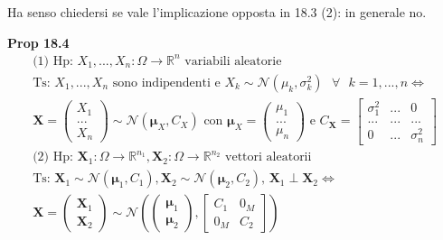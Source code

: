 \documentclass{article}
\begin{document}
Ha senso chiedersi se vale l'implicazione opposta in 18.3 (2): in generale
no.

\textbf{Prop 18.4}%
\begin{gather*}
\text{(1) Hp: }X_{1},...,X_{n}:\Omega \rightarrow 
\mathbb{R}
^{n}\text{ variabili aleatorie} \\
\text{Ts: }X_{1},...,X_{n}\text{ sono indipendenti e }X_{k}\sim \mathcal{N}%
\left( \mu _{k},\sigma _{k}^{2}\right) \text{ }\forall \text{ }%
k=1,...,n\Longleftrightarrow \\
\mathbf{X}=\left( 
\begin{array}{c}
X_{1} \\ 
... \\ 
X_{n}%
\end{array}%
\right) \sim \mathcal{N}\left( \mathbf{\mu }_{X},C_{X}\right) \text{ con }%
\mathbf{\mu }_{X}=\left( 
\begin{array}{c}
\mu _{1} \\ 
... \\ 
\mu _{n}%
\end{array}%
\right) \text{ e }C_{\mathbf{X}}=\left[ 
\begin{array}{ccc}
\sigma _{1}^{2} & ... & 0 \\ 
... & ... & ... \\ 
0 & ... & \sigma _{n}^{2}%
\end{array}%
\right] \\
\text{(2) Hp: }\mathbf{X}_{1}:\Omega \rightarrow 
\mathbb{R}
^{n_{1}},\mathbf{X}_{2}:\Omega \rightarrow 
\mathbb{R}
^{n_{2}}\text{ vettori aleatorii} \\
\text{Ts: }\mathbf{X}_{1}\sim \mathcal{N}\left( \mathbf{\mu }%
_{1},C_{1}\right) ,\mathbf{X}_{2}\sim \mathcal{N}\left( \mathbf{\mu }%
_{2},C_{2}\right) \text{, }\mathbf{X}_{1}\mathbf{\perp X}_{2}%
\Longleftrightarrow \\
\mathbf{X}=\left( 
\begin{array}{c}
\mathbf{X}_{1} \\ 
\mathbf{X}_{2}%
\end{array}%
\right) \sim \mathcal{N}\left( \left( 
\begin{array}{c}
\mathbf{\mu }_{1} \\ 
\mathbf{\mu }_{2}%
\end{array}%
\right) ,\left[ 
\begin{array}{cc}
C_{1} & 0_{M} \\ 
0_{M} & C_{2}%
\end{array}%
\right] \right)
\end{gather*}
\end{document}
